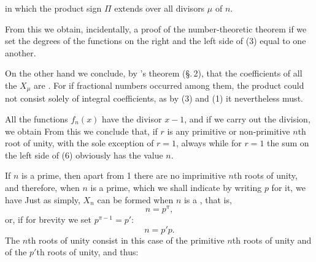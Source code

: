 in which the product sign $\Pi$ extends over all divisors $\mu$ of $n$.

From this we obtain, incidentally, a proof of the number-theoretic
theorem
if we set the degrees of the functions on the right and the
left side of (3) equal to one another.

On the other hand we conclude, by 's theorem
(\S.\,2), that the coefficients of all the $X_\mu$ are .
For if fractional numbers occurred among them, the
product could not consist solely of integral coefficients, as by (3) and (1) it nevertheless must.

All the functions $f_n(x)$ have the divisor $x-1$, and if
we carry out the division, we obtain
From this we conclude that, if $r$ is any primitive
or non-primitive $n$th root of unity, with the sole exception of $r=1$, always
while for $r=1$ the sum on the left side of (6)
obviously has the value $n$.

If $n$ is a prime, then apart from 1 there are no imprimitive $n$th roots of unity, and therefore, when $n$ is a prime, which we shall indicate by writing $p$ for it,
we have
Just as simply, $X_n$ can be formed when $n$ is a , that is,
\[
n = p^{\pi},
\]
or, if for brevity we set $p^{\pi-1} = p'$:
\[
n = p'p.
\]
The $n$th roots of unity consist in this case of the
primitive $n$th roots of unity and of the $p'$th roots of unity,
and thus:
